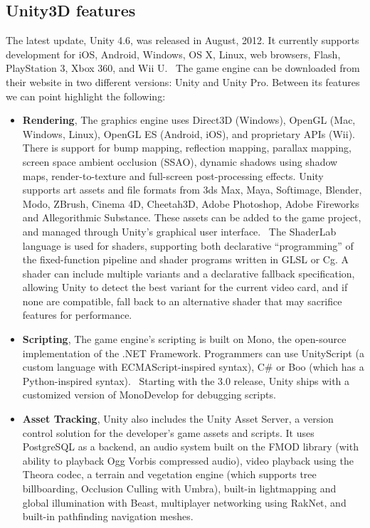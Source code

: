 \subsection{Unity3D features}
\label{subsec:unityfeatures}
The latest update, Unity 4.6, was released in August, 2012. It currently supports development for iOS, Android, Windows, OS X, Linux, web browsers, Flash, PlayStation 3, Xbox 360, and Wii U.~\cite{unitypress2} The game engine can be downloaded from their website in two different versions: Unity and Unity Pro. Between its features we can point highlight the following:
\begin{itemize}
\item \textbf{Rendering}, The graphics engine uses Direct3D (Windows), OpenGL (Mac, Windows,
Linux), OpenGL ES (Android, iOS), and proprietary APIs (Wii). There is support for bump mapping, reflection mapping, parallax mapping, screen space ambient occlusion (SSAO), dynamic shadows using shadow maps, render-to-texture and full-screen post-processing effects.
Unity supports art assets and file formats from 3ds Max, Maya, Softimage, Blender, Modo, ZBrush, Cinema 4D, Cheetah3D, Adobe Photoshop, Adobe Fireworks and Allegorithmic Substance. These assets can be added to the game project, and managed through Unity's graphical user interface.~\cite{unitypress3}
The ShaderLab language is used for shaders, supporting both declarative \enquote{programming} of the fixed-function pipeline and shader programs written in GLSL or Cg. A shader can include multiple variants and a declarative fallback specification, allowing Unity to detect the best variant for the current video card, and if none are compatible, fall back to an alternative shader that may sacrifice features for performance.~\cite{unitypress4}
\item \textbf{Scripting}, The game engine's scripting is built on Mono, the open-source implementation
of the .NET Framework. Programmers can use UnityScript (a custom language with ECMAScript-inspired syntax), C\# or Boo (which has a Python-inspired syntax).~\cite{unitypress5} Starting with the 3.0 release, Unity ships with a customized version of MonoDevelop for debugging scripts.~\cite{unitypress6}
\item \textbf{Asset Tracking}, Unity also includes the Unity Asset Server, a version control solution for the developer's game assets and scripts. It uses PostgreSQL as a backend, an audio system built on the FMOD library (with ability to playback Ogg Vorbis compressed audio), video playback using the Theora codec, a terrain and vegetation engine (which supports tree billboarding, Occlusion Culling with Umbra), built-in lightmapping and global illumination with Beast, multiplayer networking using RakNet, and built-in pathfinding navigation meshes.~\cite{unitypress7}

\end{itemize}
